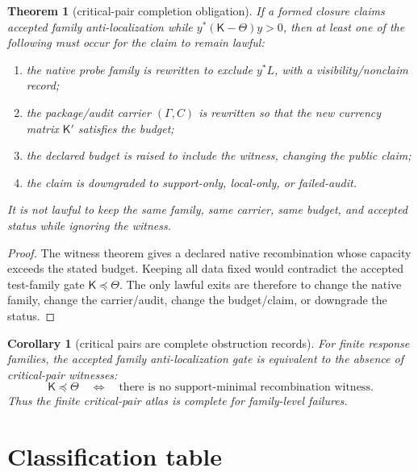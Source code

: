 \documentclass[11pt]{article}
\newtheorem{theorem}{Theorem}
\newtheorem{corollary}{Corollary}
\newcommand{\K}{\mathsf K}
\begin{document}
\begin{theorem}[critical-pair completion obligation]
If a formed closure claims accepted family anti-localization while $y^*(\K-\Theta)y>0$, then at least one of the following must occur for the claim to remain lawful:
\begin{enumerate}[label=(\roman*)]
\item the native probe family is rewritten to exclude $y^*L$, with a visibility/nonclaim record;
\item the package/audit carrier $(\Gamma,C)$ is rewritten so that the new currency matrix $\K'$ satisfies the budget;
\item the declared budget is raised to include the witness, changing the public claim;
\item the claim is downgraded to support-only, local-only, or failed-audit.
\end{enumerate}
It is not lawful to keep the same family, same carrier, same budget, and accepted status while ignoring the witness.
\end{theorem}

\begin{proof}
The witness theorem gives a declared native recombination whose capacity exceeds the stated budget.  Keeping all data fixed would contradict the accepted test-family gate $\K\preceq\Theta$.  The only lawful exits are therefore to change the native family, change the carrier/audit, change the budget/claim, or downgrade the status.
\end{proof}

\begin{corollary}[critical pairs are complete obstruction records]
For finite response families, the accepted family anti-localization gate is equivalent to the absence of critical-pair witnesses:
\[
  \K\preceq\Theta
  \quad\Longleftrightarrow\quad
  \text{there is no support-minimal recombination witness.}
\]
Thus the finite critical-pair atlas is complete for family-level failures.
\end{corollary}

\section{Classification table}
\end{document}
